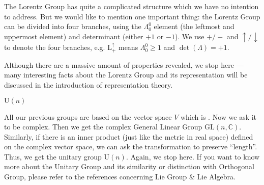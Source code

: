 \documentclass[letterpaper,10pt,english]{sphinxmanual}
\begin{document}
The Lorentz Group has quite a complicated structure which we have no intention to address. But we would like to mention one important thing: the Lorentz Group can be divided into four branches, using the \(\varLambda^0_0\) element (the leftmost and uppermost element) and determinant (either \(+1\) or \(-1\)). We use \(+/-\) and \(\uparrow/\downarrow\) to denote the four branches, e.g. \(\mathrm{L}^\uparrow_+\) means \(\varLambda^0_0\geqslant1\) and \(\det(\varLambda)=+1\).

Although there are a massive amount of properties revealed, we stop here --- many interesting facts about the Lorentz Group and its representation will be discussed in the introduction of representation theory.

 \(\mathrm{U}(n)\)

All our previous groups are based on the vector space \(V\) which is . Now we ask it to be complex. Then we get the complex General Linear Group \(\mathrm{GL}(n,\mathbb{C})\). Similarly, if there is an inner product (just like the metric in real space) defined on the complex vector space, we can ask the transformation to preserve ``length''. Thus, we get the unitary group \(\mathrm{U}(n)\). Again, we stop here. If you want to know more about the Unitary Group and its similarity or distinction with Orthogonal Group, please refer to the references concerning Lie Group \& Lie Algebra.



\renewcommand{\indexname}{Index}
\printindex
\end{document}
